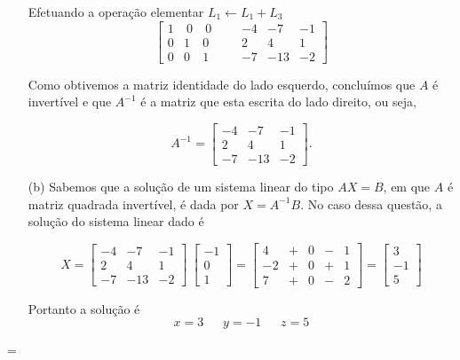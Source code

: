 \begin{solution}
\begin{enumerate}
Efetuando a operação elementar $L_1 \leftarrow L_1 + L_3$ 
$$\left[ \begin{array}{rrrr|rrrr}
 1  & \ 0  & \ 0   & & &    -4 &   -7 &   -1  \\
 0  &   1  &   0   & & &     2 &    4 &    1  \\
 0  &   0  &   1   & & &    -7 &  -13 &   -2 
\end{array} \right]$$


\bigskip
Como obtivemos a matriz identidade do lado esquerdo, concluímos que $A$ é \linebreak 
invertível e que $A^{-1}$ é a matriz que esta escrita do lado direito, ou seja,

$$A^{-1} = \left[ \begin{array}{rrrr}
 -4 &  -7 &   -1  \\
  2 &   4 &    1  \\
 -7 & -13 &   -2 
\end{array} \right] .$$
 

\bigskip
\item[(b)] Sabemos que a solução de um sistema linear do tipo $AX=B$, em que $A$ é matriz quadrada invertível, é dada por $X = A^{-1}B$. No caso dessa questão, a solução do sistema linear dado é

$$X = 
\left[ \begin{array}{rrrr}
 -4 &  -7 &   -1  \\
  2 &   4 &    1  \\
 -7 & -13 &   -2 
\end{array} \right] \ 
\left[ \begin{array}{rrr} -1 \\ 0 \\ 1 \end{array} \right] = 
\left[ \begin{array}{rrrrr} 4 & + & 0 & - & 1  \\ -2 & + & 0 & + & 1 \\ 7 & + & 0 & - & 2 \end{array} \right] = 
\left[ \begin{array}{r}  3  \\ -1 \\  5 \end{array} \right]$$

\bigskip
Portanto a solução é
$$x=3 \ \ \ \ \ \ \ y=-1 \ \ \ \ \ \ \ z=5$$

\end{enumerate}
=
\end{solution}

